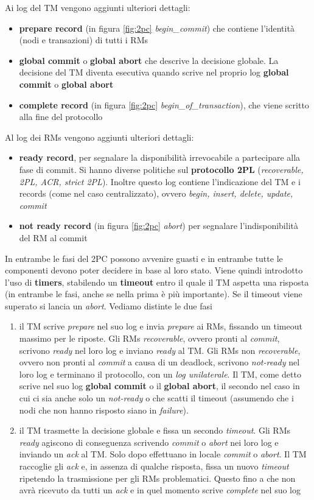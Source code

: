 \documentclass[a4paper,12pt, oneside]{book}
\begin{document}
Ai log del TM vengono aggiunti ulteriori dettagli:
\begin{itemize}
  \item \textbf{prepare record} (in figura \ref{fig:2pc} \textit{begin\_commit})
  che contiene l'identità (nodi e transazioni) di tutti i RMs
  \item \textbf{global commit} o \textbf{global abort} che descrive la decisione
  globale. La decisione del TM diventa esecutiva quando scrive nel proprio log
  \textbf{global commit} o \textbf{global abort} 
  \item \textbf{complete record} (in figura \ref{fig:2pc}
  \textit{begin\_of\_transaction}), che viene scritto alla fine del protocollo
\end{itemize}
Al log dei RMs vengono aggiunti ulteriori dettagli:
\begin{itemize}
  \item \textbf{ready record}, per segnalare la disponibilità irrevocabile a
  partecipare alla fase di commit. Si hanno diverse politiche sul
  \textbf{protocollo 2PL} (\textit{recoverable, 2PL, ACR, strict 2PL}). Inoltre
  questo log contiene l'indicazione del TM e i records (come nel caso
  centralizzato), ovvero \textit{begin, insert, delete, update, commit}
  \item \textbf{not ready record} (in figura \ref{fig:2pc} \textit{abort}) per
  segnalare l'indisponibilità del RM al commit
\end{itemize}
In entrambe le fasi del 2PC possono avvenire guasti e in entrambe tutte le
componenti devono poter decidere in base al loro stato. Viene quindi introdotto
l'uso di \textbf{timers}, stabilendo un \textbf{timeout} entro il quale il TM
aspetta una risposta (in entrambe le fasi, anche se nella prima è più
importante). Se il timeout viene superato si lancia un \textit{abort}. Vediamo
distinte le due fasi
\begin{enumerate}
  \item il TM scrive \textit{prepare} nel suo log e invia \textit{prepare} ai
  RMs, fissando un timeout massimo per le riposte. Gli RMs \textit{recoverable},
  ovvero pronti al \textit{commit}, scrivono \textit{ready} nel loro log e
  inviano \textit{ready} al TM. Gli RMs non \textit{recoverable},
  ovvero non pronti al \textit{commit} a causa di un deadlock, scrivono
  \textit{not-ready} nel loro log e terminano il protocollo, con un \textit{log
    unilaterale}. Il TM, come detto scrive nel suo log  \textbf{global commit} o
  il \textbf{global abort}, il secondo nel caso in cui ci sia anche solo un
  \textit{not-ready} o che scatti il timeout (assumendo che i nodi che non hanno
  risposto siano in \textit{failure}).
  \item il TM trasmette la decisione globale e fissa un secondo
  \textit{timeout}. Gli RMs \textit{ready} agiscono di conseguenza scrivendo
  \textit{commit} o \textit{abort} nei loro log e inviando un \textit{ack} al
  TM. Solo dopo effettuano in locale \textit{commit} o \textit{abort}. Il TM
  raccoglie gli \textit{ack} e, in assenza di qualche risposta, fissa un nuovo
  \textit{timeout} ripetendo la trasmissione per gli RMs problematici. Questo
  fino a che non avrà ricevuto da tutti un \textit{ack} e in quel momento scrive
  \textit{complete} nel suo log
\end{enumerate}
\end{document}
